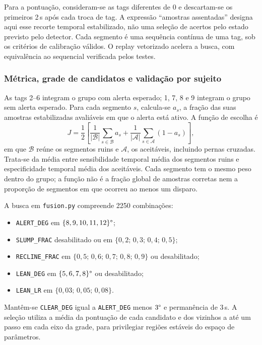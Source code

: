Para a pontuação, consideram-se as tags diferentes de 0 e descartam-se
os primeiros 2\,s após cada troca de tag. A expressão ``amostras
assentadas'' designa aqui esse recorte temporal estabilizado, não
uma seleção de acertos pelo estado previsto pelo detector. Cada
segmento é uma sequência contínua de uma tag, sob os critérios de
calibração válidos. O replay vetorizado acelera a busca, com
equivalência ao sequencial verificada pelos testes.

\subsubsection{Métrica, grade de candidatos e validação por sujeito}

As tags 2--6 integram o grupo com alerta esperado; 1, 7, 8 e 9
integram o grupo sem alerta esperado. Para cada segmento $s$, calcula-se
$a_s$, a fração das suas amostras estabilizadas avaliáveis em que o
alerta está ativo. A função de escolha é
\begin{equation}
 J=\frac{1}{2}\left[
 \frac{1}{|\mathcal{B}|}\sum_{s\in\mathcal{B}}a_s+
 \frac{1}{|\mathcal{A}|}\sum_{s\in\mathcal{A}}(1-a_s)
 \right],
 \label{eq:met-pontuacao}
\end{equation}
em que $\mathcal{B}$ reúne os segmentos ruins e $\mathcal{A}$, os
aceitáveis, incluindo pernas cruzadas. Trata-se da média entre
sensibilidade temporal média dos segmentos ruins e especificidade
temporal média dos aceitáveis. Cada segmento tem o mesmo peso dentro
do grupo; a função não é a fração global de amostras corretas nem a
proporção de segmentos em que ocorreu ao menos um disparo.

A busca em \texttt{fusion.py} compreende 2250 combinações:
\begin{itemize}[nosep]
  \item \texttt{ALERT\_DEG} em $\{8,9,10,11,12\}\degree{}$;
  \item \texttt{SLUMP\_FRAC} desabilitado ou em $\{0{,}2;\,0{,}3;\,0{,}4;\,0{,}5\}$;
  \item \texttt{RECLINE\_FRAC} em $\{0{,}5;\,0{,}6;\,0{,}7;\,0{,}8;\,0{,}9\}$
        ou desabilitado;
  \item \texttt{LEAN\_DEG} em $\{5,6,7,8\}\degree{}$ ou desabilitado;
  \item \texttt{LEAN\_LR} em $\{0{,}03;\,0{,}05;\,0{,}08\}$.
\end{itemize}
Mantêm-se \texttt{CLEAR\_DEG} igual a \texttt{ALERT\_DEG} menos $3\degree{}$
e permanência de 3\,s. A seleção utiliza a média da pontuação de
cada candidato e dos vizinhos a até um passo em cada eixo da grade,
para privilegiar regiões estáveis do espaço de parâmetros.

